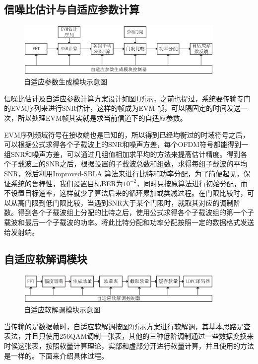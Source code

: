 \subsection{信噪比估计与自适应参数计算}
\begin{figure}[htbp]
\centering
\includegraphics[width=0.9\textwidth]{figures/chapter-5/AdaptiveParameterGenerator.eps}
\caption{自适应参数生成模块示意图}
\label{fig:AdaptiveParameterGenerator}
\end{figure}
信噪比估计及自适应参数计算方案设计如图\ref{fig:AdaptiveParameterGenerator}所示，之前也提过，系统要传输专门的EVM序列来进行SNR估计，这样的帧成为EVM 帧，可以隔固定的时间发送一次，所以处理EVM帧其实就是求当前信道下的自适应参数。

EVM序列频域符号在接收端也是已知的，所以得到已经均衡过的时域符号之后，可以根据公式求得各个子载波上的SNR和噪声方差，每个OFDM符号都能得到一组SNR和噪声方差，可以通过几组值相加求平均的方法来提高估计精度。得到各个子载波上的SNR之后，根据设置的子载波总数和组数，求得每组子载波的平均SNR，然后利用Improved-SBLA 算法来进行比特和功率分配，为了简便起见，保证系统的鲁棒性，我们设置目标BER为$10^{-2}$，同时只按原算法进行初始分配，而不设置目标速率，这样就少了算法后来的循环累加或类减过程。在门限比较时，可以从高门限到低门限比较，当遇到SNR大于某个门限时，就取其对应的调制阶数。得到各个子载波组上分配的比特之后，使用公式求得各个子载波组的第一个子载波和最后一个子载波的功率。将此比特分配和功率分配按照一定的数据格式发送给发射端。
\subsection{自适应软解调模块}
\begin{figure}[htbp]
\centering
\includegraphics[width=0.9\textwidth]{figures/chapter-5/AdaptiveDemodulation.eps}
\caption{自适应软解调模块示意图}
\label{fig:AdaptiveDemodulation}
\end{figure}
当传输的是数据帧时，自适应软解调按图\ref{fig:AdaptiveDemodulation}所示方案进行软解调，其基本思路是查表法，并且只使用256QAM调制一张表，其他的三种低阶调制通过一些数据变换来时候这张表，按照软量计算理论，实部和虚部分开进行软量计算，并且使用的方法是一样的。下面来介绍具体过程。

